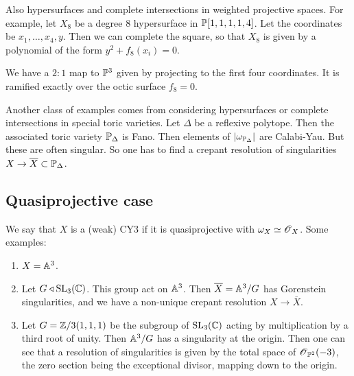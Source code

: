 \documentclass[11pt, english]{article}
\begin{document}
\begin{example}
Also hypersurfaces and complete intersections in weighted projective spaces. For example, let $X_8$ be a degree $8$ hypersurface in $\mathbb{P}[1,1,1,1,4]$. Let the coordinates be $x_1,\ldots,x_4,y$. Then we can complete the square, so that $X_8$ is given by a polynomial of the form $y^2+f_8(x_i)=0$. 

We have a $2:1$ map to $\mathbb{P}^3$ given by projecting to the first four coordinates. It is ramified exactly over the octic surface $f_8=0$. 
\end{example}

\begin{example}
Another class of examples comes from considering hypersurfaces or complete intersections in special toric varieties. Let $\Delta$ be a reflexive polytope. Then the associated toric variety $\mathbb{P}_\Delta$ is Fano. Then elements of $|\omega_{\mathbb{P}_\Delta}|$ are Calabi-Yau. But these are often singular. So one has to find a crepant resolution of singularities $X \to \overline X \subset \mathbb{P}_\Delta$.
\end{example}

\subsection{Quasiprojective case}

We say that $X$ is a (weak) CY3 if it is quasiprojective with $\omega_X \simeq \operatorname{\mathscr{O}}_X$. Some examples:

\begin{enumerate}
	\item $X= \mathbb{A}^3$.
	\item Let $G \triangleleft \operatorname{SL}_3(\mathbb{C})$. This group act on $\mathbb{A}^3$. Then $\overline X = \mathbb{A}^3/G$ has Gorenstein singularities, and we have a non-unique crepant resolution $X \to \overline X$.
	\item Let $G=\mathbb{Z}/3(1,1,1)$ be the subgroup of $\operatorname{SL}_3(\mathbb{C})$ acting by multiplication by a third root of unity. Then $\mathbb{A}^3/G$ has a singularity at the origin. Then one can see that a resolution of singularities is given by the total space of $\operatorname{\mathscr{O}}_{\mathbb{P}^2}(-3)$, the zero section being the exceptional divisor, mapping down to the origin. 
\end{enumerate}
\end{document}
